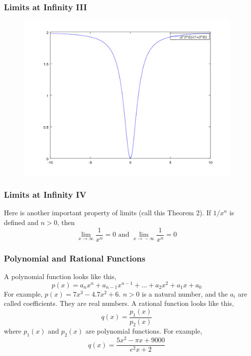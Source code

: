 \documentclass[xcolor=dvipsnames]{beamer}
\begin{document}
\begin{frame}
  \frametitle{Limits at Infinity III}
  \begin{figure}[h]
    \includegraphics[scale=.5]{./diagrams/lai.png}
  \end{figure}
\end{frame}

\begin{frame}
  \frametitle{Limits at Infinity IV}
Here is another important property of limits (call this \alert{Theorem
2}). If $1/x^{n}$ is defined and $n>0$, then
\begin{equation}
  \label{eq:faingiej}
  \lim_{x\rightarrow{}\infty}\frac{1}{x^{n}}=0\mbox{ and }\lim_{x\rightarrow{}-\infty}\frac{1}{x^{n}}=0
\end{equation}
\end{frame}

\begin{frame}
  \frametitle{Polynomial and Rational Functions}
A polynomial function looks like this,
\begin{equation}
  \label{eq:kaimeeyo}
  p(x)=a_{n}x^{n}+a_{n-1}x^{n-1}+\ldots{}+a_{2}x^{2}+a_{1}x+a_{0}
\end{equation}
For example, $p(x)=7x^{3}-4.7x^{2}+6$. $n>0$ is a natural number, and
the $a_{i}$ are called \alert{coefficients}. They are real numbers.
A rational function looks like this,
\begin{equation}
  \label{eq:raephoot}
  q(x)=\frac{p_{1}(x)}{p_{2}(x)}
\end{equation}
where $p_{1}(x)$ and $p_{2}(x)$ are polynomial functions. For example,
\begin{equation}
  \label{eq:yaingiaj}
  q(x)=\frac{5x^{2}-\pi{}x+9000}{e^{2}x+2}
\end{equation}
\end{frame}
\end{document}
